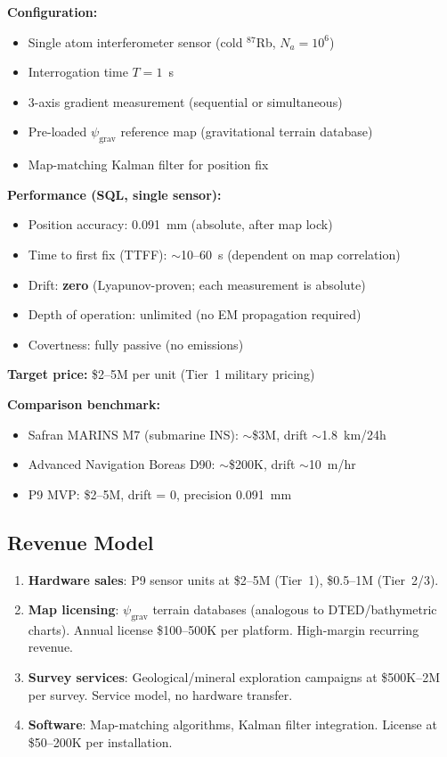 \documentclass[11pt]{article}
\theoremstyle{definition}
\theoremstyle{remark}
\newcommand{\psigrav}{\psi_{\mathrm{grav}}}
\begin{document}
\begin{tcolorbox}[colback=blue!5!white, colframe=blue!50!black,
  title=\textbf{P9 Minimum Viable Product: Submarine $\psigrav$-Navigator}]

\textbf{Configuration:}
\begin{itemize}[nosep]
\item Single atom interferometer sensor (cold $^{87}$Rb, $N_a = 10^6$)
\item Interrogation time $T = 1$~s
\item 3-axis gradient measurement (sequential or simultaneous)
\item Pre-loaded $\psigrav$ reference map (gravitational terrain database)
\item Map-matching Kalman filter for position fix
\end{itemize}

\textbf{Performance (SQL, single sensor):}
\begin{itemize}[nosep]
\item Position accuracy: 0.091~mm (absolute, after map lock)
\item Time to first fix (TTFF): $\sim$10--60~s (dependent on map correlation)
\item Drift: \textbf{zero} (Lyapunov-proven; each measurement is absolute)
\item Depth of operation: unlimited (no EM propagation required)
\item Covertness: fully passive (no emissions)
\end{itemize}

\textbf{Target price:} \$2--5M per unit (Tier~1 military pricing)

\textbf{Comparison benchmark:}
\begin{itemize}[nosep]
\item Safran MARINS M7 (submarine INS): $\sim$\$3M, drift $\sim$1.8~km/24h
\item Advanced Navigation Boreas D90: $\sim$\$200K, drift $\sim$10~m/hr
\item P9 MVP: \$2--5M, drift = 0, precision 0.091~mm
\end{itemize}
\end{tcolorbox}

\subsection{Revenue Model}

\begin{enumerate}
\item \textbf{Hardware sales}: P9 sensor units at \$2--5M (Tier~1), \$0.5--1M (Tier~2/3).
\item \textbf{Map licensing}: $\psigrav$ terrain databases (analogous to DTED/bathymetric
  charts). Annual license \$100--500K per platform. High-margin recurring revenue.
\item \textbf{Survey services}: Geological/mineral exploration campaigns at
  \$500K--2M per survey. Service model, no hardware transfer.
\item \textbf{Software}: Map-matching algorithms, Kalman filter integration.
  License at \$50--200K per installation.
\end{enumerate}
\end{document}
